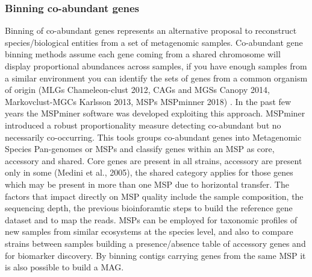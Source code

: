 \documentclass{article}
\begin{document}
\subsubsection{Binning co-abundant genes}
Binning of co-abundant genes represents an alternative proposal to reconstruct species/biological entities from a set of metagenomic samples.
Co-abundant gene binning methods assume each gene coming from a shared chromosome will display proportional abundances across samples, if you have enough samples from a similar environment you can identify the sets of genes from a common organism of origin (MLGs Chameleon-clust 2012, CAGs and MGSs Canopy 2014, Markovclust-MGCs Karlsson 2013, MSPs MSPminner 2018) \cite{karypis1999chameleon, plaza2019mspminer}.
In the past few years the MSPminer software was developed exploiting this approach. MSPminer introduced a robust proportionality measure detecting co-abundant but no necessarily co-occurring.
This tools groups co-abundant genes into Metagenomic Species Pan-genomes or \glspl{MSP} and classify genes within an MSP as core, accessory and shared. Core genes are present in all strains, accessory are present only in some (Medini et al., 2005), the shared category applies for those genes which may be present in more than one MSP due to horizontal transfer.
The factors that impact directly on \gls{MSP} quality include the sample composition, the sequencing depth, the previous bioinforamtic steps to build the reference gene dataset and to map the reads.
MSPs can be employed for taxonomic profiles of new samples from similar ecosystems at the species level, and also to compare strains between samples building a presence/absence table of accessory genes and for biomarker discovery.
By binning contigs carrying genes from the same MSP it is also possible to build a \gls{MAG}.
\end{document}
